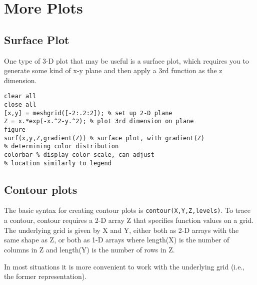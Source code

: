 \documentclass[12pt]{article}
\begin{document}
\section{More Plots}
\subsection{Surface Plot}
One type of 3-D plot that may be useful is a surface plot, which requires you to generate some kind of x-y plane and then
apply a 3rd function as the z dimension.
\begin{framed}
\begin{verbatim}
clear all
close all
[x,y] = meshgrid([-2:.2:2]); % set up 2-D plane
Z = x.*exp(-x.^2-y.^2); % plot 3rd dimension on plane
figure
surf(x,y,Z,gradient(Z)) % surface plot, with gradient(Z)
% determining color distribution
colorbar % display color scale, can adjust
% location similarly to legend
\end{verbatim}
\end{framed}
\subsection{Contour plots}
The basic syntax for creating contour plots is \texttt{contour(X,Y,Z,levels)}. To trace a contour, contour requires a 2-D array Z that specifies function values on a grid. The underlying grid is given by X and Y, either both
as 2-D arrays with the same shape as Z, or both as 1-D arrays where length(X) is the number of columns in Z and length(Y) is the number of rows in Z.

In most situations it is more convenient to work with the underlying grid (i.e., the former representation).
\end{document}
